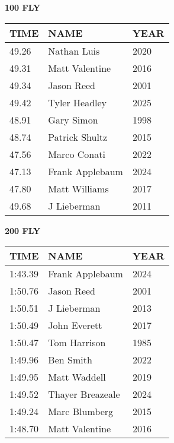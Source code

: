 \begin{minipage}[t]{0.48\textwidth}
\centering
\textbf{100 FLY}\\[0.05cm]
\begin{tabular}{@{}p{1.8cm}p{2.8cm}p{1.2cm}@{}}
\hline
\textbf{TIME} & \textbf{NAME} & \textbf{YEAR} \\
\hline
49.26 & Nathan Luis & 2020 \\
49.31 & Matt Valentine & 2016 \\
49.34 & Jason Reed & 2001 \\
49.42 & Tyler Headley & 2025 \\
48.91 & Gary Simon & 1998 \\
48.74 & Patrick Shultz & 2015 \\
47.56 & Marco Conati & 2022 \\
47.13 & Frank Applebaum & 2024 \\
47.80 & Matt Williams & 2017 \\
49.68 & J Lieberman & 2011 \\
\hline
\end{tabular}
\end{minipage}\hfill
\begin{minipage}[t]{0.48\textwidth}
\centering
\textbf{200 FLY}\\[0.05cm]
\begin{tabular}{@{}p{1.8cm}p{2.8cm}p{1.2cm}@{}}
\hline
\textbf{TIME} & \textbf{NAME} & \textbf{YEAR} \\
\hline
1:43.39 & Frank Applebaum & 2024 \\
1:50.76 & Jason Reed & 2001 \\
1:50.51 & J Lieberman & 2013 \\
1:50.49 & John Everett & 2017 \\
1:50.47 & Tom Harrison & 1985 \\
1:49.96 & Ben Smith & 2022 \\
1:49.95 & Matt Waddell & 2019 \\
1:49.52 & Thayer Breazeale & 2024 \\
1:49.24 & Marc Blumberg & 2015 \\
1:48.70 & Matt Valentine & 2016 \\
\hline
\end{tabular}
\end{minipage}

\vspace{0.4cm}

